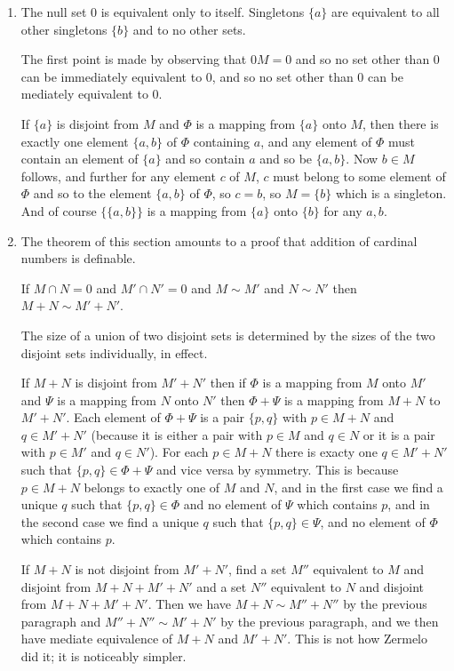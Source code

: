 \documentclass[12pt]{article}
\begin{document}
\begin{enumerate}
\item  The null set 0 is equivalent only to itself.  Singletons $\{a\}$ are equivalent to all other singletons $\{b\}$ and to no other sets.

The first point is made by observing that $0M = 0$ and so no set other than 0 can be immediately equivalent to 0, and so no set other than 0 can be mediately equivalent to 0.

If $\{a\}$ is disjoint from $M$ and $\Phi$ is a mapping from $\{a\}$ onto $M$, then there is exactly one element $\{a,b\}$ of $\Phi$ containing $a$,
and any element of $\Phi$ must contain an element of $\{a\}$ and so contain $a$ and so be $\{a,b\}$.  Now $b \in M$ follows, and further for any element $c$ of $M$,
$c$ must belong to some element of $\Phi$ and so to the element $\{a,b\}$ of $\Phi$, so $c=b$, so $M = \{b\}$ which is a singleton.  And of course $\{\{a,b\}\}$ is a mapping from $\{a\}$ onto $\{b\}$ for any $a,b$.

\item  The theorem of this section amounts to a proof that addition of cardinal numbers is definable.

If $M \cap N = 0$ and $M' \cap N'=0$ and $M\sim M'$ and $N\sim N'$ then $M+N \sim M'+N'$.

The size of a union of two disjoint sets is determined by the sizes of the two disjoint sets individually, in effect.

If $M+N$ is disjoint from $M'+N'$ then if $\Phi$ is a mapping from $M$ onto $M'$ and $\Psi$ is a mapping from $N$ onto $N'$ then
$\Phi + \Psi$ is a mapping from $M+N$ to $M'+N'$.  Each element of $\Phi + \Psi$ is a pair $\{p,q\}$ with $p \in M+N$ and $q\in M'+N'$ (because it is either a pair with
$p \in M$ and $q \in N$ or it is a pair with $p\in M'$ and $q \in N'$).  For each $p \in M+N$ there is exacty one $q \in M'+N'$ such that $\{p,q\} \in \Phi + \Psi$ and vice versa by symmetry.  This is because $p \in M+N$ belongs to exactly one of $M$ and $N$, and in the first case we find a unique $q$ such that $\{p,q\} \in \Phi$ and no element of $\Psi$ which contains $p$,
and in the second case we find a unique $q$ such that $\{p,q\} \in \Psi$, and no element of $\Phi$ which contains $p$.

If $M+N$ is not disjoint from $M'+N'$, find a set $M''$ equivalent to $M$ and disjoint from $M+N+M'+N'$ and a set $N''$ equivalent to $N$ and disjoint from $M+N+M'+N'$.
Then we have $M+N \sim M''+N''$ by the previous paragraph and $M''+N'' \sim M'+N'$ by the previous paragraph, and we then have mediate equivalence of $M+N$ and $M'+N'$.  This is not how Zermelo did it;  it is noticeably simpler.


\end{enumerate}
\end{document}
